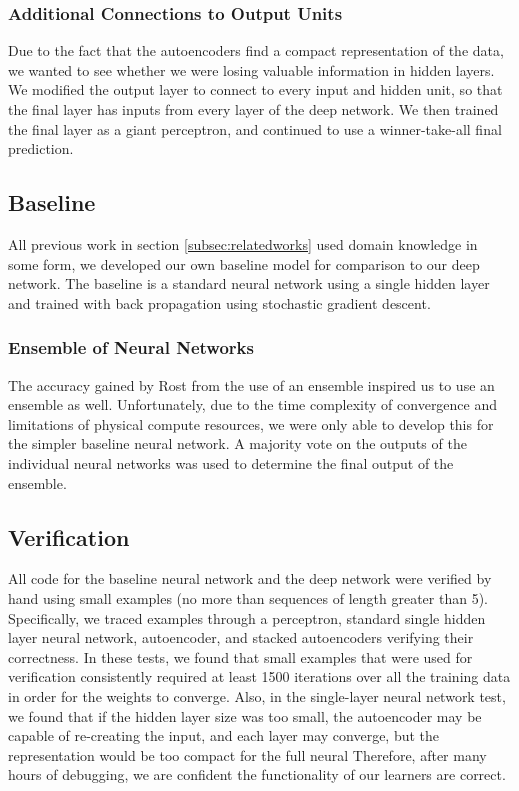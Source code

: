 \documentclass[letterpaper,twocolumn,12pt]{article}
\begin{document}
\subsubsection{Additional Connections to Output Units}
Due to the fact that the autoencoders find a compact representation of the data, we wanted to see whether we were losing valuable information in hidden layers.
We modified the output layer to connect to every input and hidden unit, so that the final layer has inputs from every layer of the deep network.
We then trained the final layer as a giant perceptron, and continued to use a winner-take-all final prediction.

\subsection{Baseline}
All previous work in section \ref{subsec:relatedworks} used domain knowledge in some form, we developed our own baseline model for comparison to our deep network.
The baseline is a standard neural network using a single hidden layer and trained with back propagation using stochastic gradient descent.

\subsubsection{Ensemble of Neural Networks}
The accuracy gained by Rost from the use of an ensemble inspired us to use an ensemble as well.
Unfortunately, due to the time complexity of convergence and limitations of physical compute resources, we were only able to develop this for the simpler baseline neural network.
A majority vote on the outputs of the individual neural networks was used to determine the final output of the ensemble.

\subsection{Verification}
All code for the baseline neural network and the deep network were verified by hand using small examples (no more than sequences of length greater than 5).
Specifically, we traced examples through a perceptron, standard single hidden layer neural network, autoencoder, and stacked autoencoders verifying their correctness.
In these tests, we found that small examples that were used for verification consistently required at least 1500 iterations over all the training data in order for the weights to converge.
Also, in the single-layer neural network test, we found that if the hidden layer size was too small, the autoencoder may be capable of re-creating the input, and each layer may converge, but the representation would be too compact for the full neural
Therefore, after many hours of debugging, we are confident the functionality of our learners are correct. 
\end{document}
